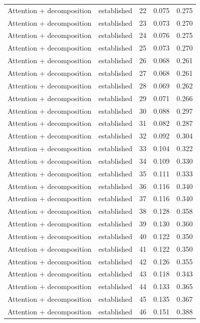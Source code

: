 \begin{tabular}{llrrr}
Attention + decomposition & established & 22 & 0.075 & 0.275 \\
Attention + decomposition & established & 23 & 0.073 & 0.270 \\
Attention + decomposition & established & 24 & 0.076 & 0.275 \\
Attention + decomposition & established & 25 & 0.073 & 0.270 \\
Attention + decomposition & established & 26 & 0.068 & 0.261 \\
Attention + decomposition & established & 27 & 0.068 & 0.261 \\
Attention + decomposition & established & 28 & 0.069 & 0.262 \\
Attention + decomposition & established & 29 & 0.071 & 0.266 \\
Attention + decomposition & established & 30 & 0.088 & 0.297 \\
Attention + decomposition & established & 31 & 0.082 & 0.287 \\
Attention + decomposition & established & 32 & 0.092 & 0.304 \\
Attention + decomposition & established & 33 & 0.104 & 0.322 \\
Attention + decomposition & established & 34 & 0.109 & 0.330 \\
Attention + decomposition & established & 35 & 0.111 & 0.333 \\
Attention + decomposition & established & 36 & 0.116 & 0.340 \\
Attention + decomposition & established & 37 & 0.116 & 0.340 \\
Attention + decomposition & established & 38 & 0.128 & 0.358 \\
Attention + decomposition & established & 39 & 0.130 & 0.360 \\
Attention + decomposition & established & 40 & 0.122 & 0.350 \\
Attention + decomposition & established & 41 & 0.122 & 0.350 \\
Attention + decomposition & established & 42 & 0.126 & 0.355 \\
Attention + decomposition & established & 43 & 0.118 & 0.343 \\
Attention + decomposition & established & 44 & 0.133 & 0.365 \\
Attention + decomposition & established & 45 & 0.135 & 0.367 \\
Attention + decomposition & established & 46 & 0.151 & 0.388 \\

\end{tabular}

